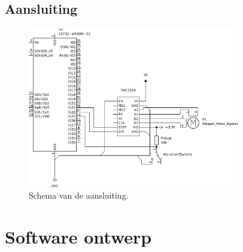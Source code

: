 \subsection{Aansluiting}
\begin{figure}[H]
    \centering
    \includegraphics[height=7cm]{figures/Wiring_BW.png}
    \caption{Schema van de aansluiting.}\label{fig:schematische_aansluiting}
\end{figure}

\section{Software ontwerp}

